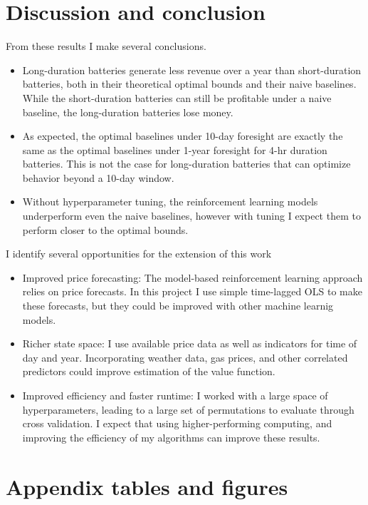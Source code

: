 \documentclass[conference]{IEEEtran}
\begin{document}
\section{Discussion and conclusion}
From these results I make several conclusions. 
\begin{itemize}
    \item Long-duration batteries generate less revenue over a year than short-duration batteries, both in their theoretical optimal bounds and their naive baselines. While the short-duration batteries can still be profitable under a naive baseline, the long-duration batteries lose money.
    \item As expected, the optimal baselines under 10-day foresight are exactly the same as the optimal baselines under 1-year foresight for 4-hr duration batteries. This is not the case for long-duration batteries that can optimize behavior beyond a 10-day window.
    \item Without hyperparameter tuning, the reinforcement learning models underperform even the naive baselines, however with tuning I expect them to perform closer to the optimal bounds.
\end{itemize}

I identify several opportunities for the extension of this work
\begin{itemize}
    \item Improved price forecasting: The model-based reinforcement learning approach relies on price forecasts. In this project I use simple time-lagged OLS to make these forecasts, but they could be improved with other machine learnig models.
    \item Richer state space: I use available price data as well as indicators for time of day and year. Incorporating weather data, gas prices, and other correlated predictors could improve estimation of the value function.
    \item Improved efficiency and faster runtime: I worked with a large space of hyperparameters, leading to a large set of permutations to evaluate through cross validation. I expect that using higher-performing computing, and improving the efficiency of my algorithms can improve these results.
\end{itemize}
\section{Appendix tables and figures \label{sec:taf}}


\end{document}
